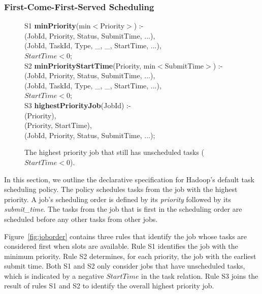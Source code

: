 \subsubsection{First-Come-First-Served Scheduling}

\begin{figure}
\label{fig:joborder}
\ssp
\centering
\begin{boxedminipage}{\linewidth}
S1 {\bf minPriority}(min$<$Priority$>$) :- \\
(JobId, Priority, Status, SubmitTime, ...), \\
(JobId, TaskId, Type, \_, \_, StartTime, ...), \\
\datalogspace $StartTime < 0$; \\
	
S2 {\bf minPriorityStartTime}(Priority, min$<$SubmitTime$>$) :- \\
(JobId, Priority, Status, SubmitTime, ...), \\
(JobId, TaskId, Type, \_, \_, StartTime, ...), \\
\datalogspace $StartTime < 0$; \\

S3 {\bf highestPriorityJob}(JobId) :- \\
(Priority), \\
(Priority, StartTime), \\
(JobId, Priority, Status, SubmitTime, ...); \\
\end{boxedminipage}
\caption{\label{fig:planseed}The highest priority job that still has unscheduled tasks ($StartTime < 0$).}
\end{figure}

In this section, we outline the declarative specification for Hadoop's default
task scheduling policy. The policy schedules tasks from the job with the
highest priority. A job's scheduling order is defined by its {\em priority} followed by its 
{\em submit\_time}. The tasks from the job that is first in the scheduling order are
scheduled before any other tasks from other jobs. 

Figure~\ref{fig:joborder} contains three rules that identify the job whose tasks are considered first
when \TT slots are available. Rule S1 identifies the job with the minimum priority. Rule S2 determines,
for each priority, the job with the earliest submit time. Both S1 and S2 only consider jobs that have unscheduled
tasks, which is indicated by a negative $StartTime$ in the task relation. Rule S3 joins the result of rules S1 and S2
to identify the overall highest priority job. 

